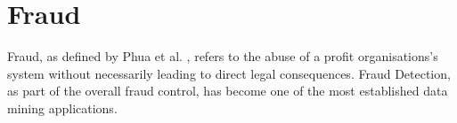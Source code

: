 \documentclass[a4paper, oneside]{csthesis}
\begin{document}
\section{Fraud}



Fraud, as defined by Phua et al. \cite{5522816}, refers to the abuse of a profit organisations's system without necessarily leading to direct legal consequences. Fraud Detection, as part of the overall fraud control, has become one of the most established data mining applications.
\end{document}
